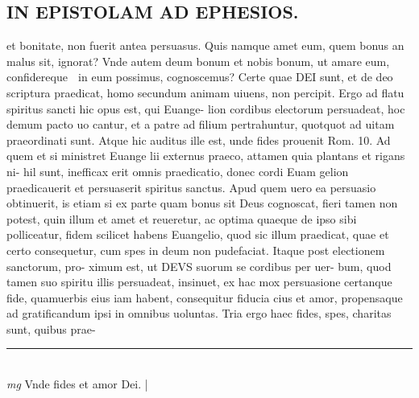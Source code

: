 \documentclass{article}
\begin{document}
\begin{pages}
\section*{IN EPISTOLAM AD EPHESIOS.  }\pstart et bonitate, non fuerit antea persuasus. Quis namque amet eum, quem bonus an malus sit, ignorat? Vnde autem deum bonum et nobis bonum, ut amare eum, confidereque  in eum possimus, cognoscemus? Certe quae DEI sunt, et de deo scriptura praedicat, homo secundum animam uiuens, non percipit.   \pend\pstart Ergo ad flatu spiritus sancti hic opus est, qui Euange- lion cordibus electorum persuadeat, hoc demum pacto uo cantur, et a patre ad filium pertrahuntur, quotquot ad uitam praeordinati sunt.  Atque hic auditus ille est, unde fides prouenit Rom. 10.  Ad quem et si ministret Euange lii externus praeco, attamen quia plantans et rigans ni- hil sunt, inefficax erit omnis praedicatio, donec cordi Euam gelion praedicauerit et persuaserit spiritus sanctus.  Apud quem uero ea persuasio obtinuerit, is etiam si ex parte quam bonus sit Deus cognoscat, fieri tamen non potest, quin illum et amet et reueretur, ac optima quaeque de ipso sibi polliceatur, fidem scilicet habens Euangelio, quod sic illum praedicat, quae et certo consequetur, cum spes in deum non pudefaciat.  Itaque post electionem sanctorum, pro- ximum est, ut DEVS suorum se cordibus per uer- bum, quod tamen suo spiritu illis persuadeat, insinuet, ex hac mox persuasione certanque fide, quamuerbis eius iam habent, consequitur fiducia cius et amor, propensaque  ad gratificandum ipsi in omnibus uoluntas.   \pend\pstart Tria ergo haec fides, spes, charitas sunt, quibus prae-  \pend
\vspace{0.5cm}\noindent
\vspace{0.2cm}\rule{1cm}{0.2pt}\\ 
\hspace{0.2cm}\textit{mg}
\footnotesize Vnde fides et amor Dei.  
\normalsize| 
\endnumbering
\end{pages}
\end{document}
